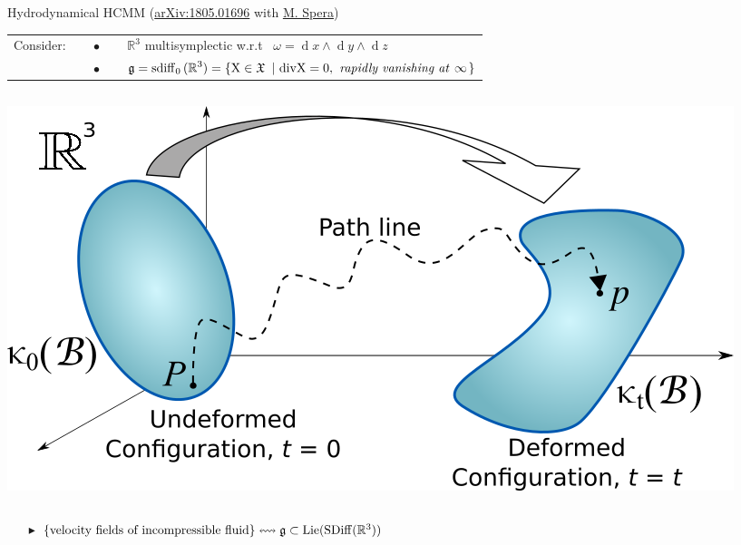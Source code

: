 \documentclass[final,a0paper,20pt,
						pdftex,
            pdfauthor={Antonio Michele Miti},
            pdftitle={Homotopy title},
            pdfsubject={Poster for the conference Super19 in Luxembourg},
            pdfkeywords={Some Keywords},
            pdfproducer={Latex with hyperref, or other system},
            pdfcreator={pdflatex, or other tool}
            ]{beamer}
\newcommand{\pinned}[1]{
    \faThumbTack 
    \hfill
    #1
    \hfill \faThumbTack
    \\
    }
\renewcommand{\d}{\ensuremath{\operatorname{d}}}
\begin{document}
\begin{frame}[t]
\begin{columns}[t]
\begin{column}{\onecolwid}
	\begin{block}{\pinned{Hydrodynamical HCMM 
	{\small(\href{http://arxiv.org/abs/1805.01696}{arXiv:1805.01696} with
	\href{http://www.dmf.unicatt.it/personale/info/Spera.html.it}{M. Spera})
	}}}
		\vspace{-0.4em}
		\begin{tabular}{lll}
			\quad Consider: 
			&$\quad\bullet\quad$
			&$\mathbb{R}^3$  multisymplectic w.r.t 
			~$\omega= \d x\wedge \d y \wedge \d z$
			\\
			&$\quad\bullet\quad$ 
			&$\displaystyle \mathfrak{g} = \rm{sdiff}_0\,(\mathbb{R}^3) 
			= \left\lbrace  X \in \mathfrak{X} ~\left\vert~ \rm{div} X = 0, \textrm{\emph{ rapidly vanishing at }}\infty \right.\right\rbrace$
		\end{tabular} 
		\vspace{.5em}
		\begin{columns}[c]
			\hfill
			\begin{column}{0.425\linewidth}
				\centering
				\includegraphics[width=0.95\linewidth]{Pictures/Figure_continuum.png}
			\end{column}
			\begin{column}{0.525\linewidth}
				\centering
				
			\end{column}
		\end{columns}	
		
		\begin{itemize}
			\item[$\blacktriangleright$] 
			$\{\text{velocity fields of incompressible fluid}\}
			\leftrightsquigarrow 
			\mathfrak{g} \subset \rm{Lie}( \rm{SDiff}(\mathbb{R}^3))$
		\end{itemize}


\end{block}
\end{column}
\end{columns}
\end{frame}
\end{document}
